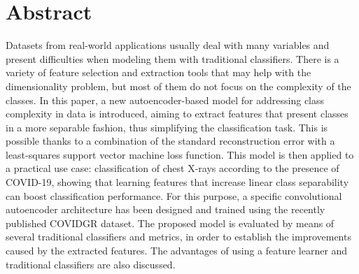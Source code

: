 %
\section*{Abstract} %
Datasets from real-world applications usually deal with many variables and present
difficulties when modeling them with traditional classifiers. There is a variety of feature
selection and extraction tools that may help with the dimensionality problem, but most of them
do not focus on the complexity of the classes. In this paper, a new autoencoder-based model
for addressing class complexity in data is introduced, aiming to extract features that present
classes in a more separable fashion, thus simplifying the classification task. This is possible thanks to a combination of the standard reconstruction error with a least-squares support vector machine loss function. This model is
then applied to a practical use case: classification of chest X-rays according to the presence
of COVID-19, showing that learning features that increase linear class separability can boost classification performance. For this purpose, a specific convolutional autoencoder architecture has been designed and trained using the recently published COVIDGR dataset. The proposed model is evaluated by means of several traditional classifiers and metrics, in order to establish the improvements caused by the extracted features. The advantages of using a feature learner and traditional classifiers are also discussed.
